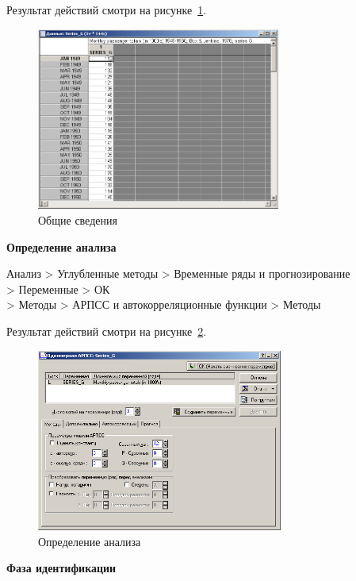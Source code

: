 Результат действий смотри на рисунке~\ref{fig:1}.

\begin{figure}[!h]
  \centering

  \includegraphics[height=6cm]
  {inc/1.PNG}

  \caption{Общие сведения}

  \label{fig:1}
\end{figure}

\begin{center}
  \textbf{Определение анализа}
\end{center}

Анализ > Углубленные методы > Временные ряды и прогнозирование\\
> Переменные > ОК\\
> Методы > АРПСС и автокорреляционные функции > Методы

Результат действий смотри на рисунке~\ref{fig:2}.

\begin{figure}[!h]
  \centering

  \includegraphics[height=6cm]
  {inc/2.PNG}

  \caption{Определение анализа}

  \label{fig:2}
\end{figure}

\begin{center}
  \textbf{Фаза идентификации}
\end{center}


